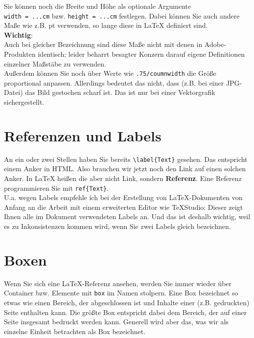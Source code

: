 Sie können noch die Breite und Höhe als optionale Argumente \\\verb|width = ...cm| bzw. \verb|height = ...cm| festlegen. Dabei können Sie auch andere Maße wie z.B. pt verwenden, so lange diese in LaTeX definiert sind.\\

\textbf{Wichtig}:\\

Auch bei gleicher Bezeichnung sind diese Maße nicht mit denen in Adobe-Produkten identisch; leider beharrt besagter Konzern darauf eigene Definitionen einzelner Maßstäbe zu verwenden.\\

Außerdem können Sie noch über Werte wie \verb|.75/coumnwidth| die Größe proportional anpassen. Allerdings bedeutet das nicht, dass (z.B. bei einer JPG-Datei) das Bild gestochen scharf ist. Das ist nur bei einer Vektorgrafik sichergestellt.

\section{Referenzen und Labels}

An ein oder zwei Stellen haben Sie bereits \verb|\label{Text}| gesehen. Das entspricht einem Anker in HTML. Also brauchen wir jetzt noch den \glqq{}Link\grqq{} auf einen solchen Anker. In LaTeX heißen die aber nicht Link, sondern \textbf{Referenz}. Eine Referenz programmieren Sie mit \verb|ref{Text}|.\\

U.a. wegen Labels empfehle ich bei der Erstellung von LaTeX-Dokumenten von Anfang an die Arbeit mit einem erweiterten Editor wie TeXStudio: Dieser zeigt Ihnen alle im Dokument verwendeten Labels an. Und das ist deshalb wichtig, weil es zu Inkonsistenzen kommen wird, wenn Sie zwei Labels gleich bezeichnen.

\section{Boxen}

Wenn Sie sich eine LaTeX-Referenz ansehen, werden Sie immer wieder über Container bzw. Elemente mit \verb|box| im Namen stolpern. Eine Box bezeichnet so etwas wie einen Bereich, der abgeschlossen ist und Inhalte einer (z.B. gedruckten) Seite enthalten kann. Die größte Box entspricht dabei dem Bereich, der auf einer Seite insgesamt bedruckt werden kann. Generell wird aber das, was wir als einzelne Einheit betrachten als Box bezeichnet.\\

